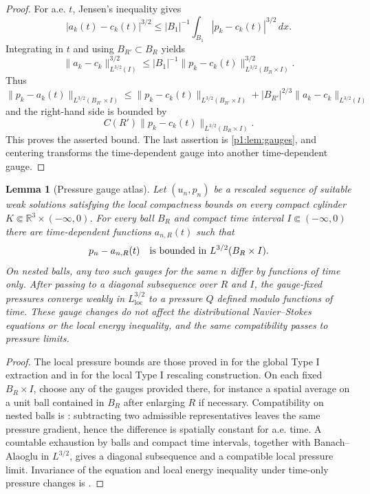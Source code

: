 \documentclass[11pt]{amsart}
\theoremstyle{plain}
\newtheorem{lemma}[lemma]{Lemma}
\theoremstyle{definition}
\theoremstyle{remark}
\numberwithin{equation}{section}
\newcommand{\R}{\mathbb R}
\newcommand{\loc}{\mathrm{loc}}
\begin{document}
\begin{proof}
For a.e. \(t\), Jensen's inequality gives
\[
   |a_k(t)-c_k(t)|^{3/2}
   \le |B_1|^{-1}\int_{B_1}|p_k-c_k(t)|^{3/2}\,dx .
\]
Integrating in \(t\) and using \(B_{R'}\subset B_R\) yields
\[
   \|a_k-c_k\|_{L^{3/2}(I)}^{3/2}
   \le
   |B_1|^{-1}\|p_k-c_k(t)\|_{L^{3/2}(B_R\times I)}^{3/2}.
\]
Thus
\[
   \|p_k-a_k(t)\|_{L^{3/2}(B_{R'}\times I)}
   \le
   \|p_k-c_k(t)\|_{L^{3/2}(B_{R'}\times I)}
   +|B_{R'}|^{2/3}\|a_k-c_k\|_{L^{3/2}(I)}
\]
and the right-hand side is bounded by
\[
   C(R')\|p_k-c_k(t)\|_{L^{3/2}(B_R\times I)} .
\]
This proves the asserted bound.
The last assertion is \cref{p1:lem:gauges}, and centering transforms the
time-dependent gauge into another time-dependent gauge.
\end{proof}

\begin{lemma}[Pressure gauge atlas]\label{p1:lem:pressure-atlas}
Let \((u_n,p_n)\) be a rescaled sequence of suitable weak solutions satisfying
the local compactness bounds on every compact cylinder
\(K\Subset\R^3\times(-\infty,0)\).  For every ball \(B_R\) and compact time
interval \(I\Subset(-\infty,0)\) there are time-dependent functions
\(a_{n,R}(t)\) such that
\[
   p_n-a_{n,R}(t)
   \quad\hbox{is bounded in }L^{3/2}(B_R\times I).
\]
On nested balls, any two such gauges for the same \(n\) differ by functions of
time only.  After passing to a diagonal subsequence over \(R\) and \(I\), the
gauge-fixed pressures converge weakly in \(L^{3/2}_{\loc}\) to a pressure
\(Q\) defined modulo functions of time.  These gauge changes do not affect the
distributional Navier--Stokes equations or the local energy inequality, and
the same compatibility passes to pressure limits.
\end{lemma}

\begin{proof}
The local pressure bounds are those proved in  for the
global Type I extraction and in
 for the local Type I
rescaling construction.  On each fixed \(B_R\times I\), choose any of the gauges
provided there, for instance a spatial average on a unit ball contained in
\(B_R\) after enlarging \(R\) if necessary.  Compatibility on nested balls is
: subtracting two admissible representatives
leaves the same pressure gradient, hence the difference is spatially constant
for a.e. time.  A countable exhaustion by balls and compact time intervals,
together with Banach--Alaoglu in \(L^{3/2}\), gives a diagonal subsequence and
a compatible local pressure limit.  Invariance of the equation and local
energy inequality under time-only pressure changes is .
\end{proof}
\end{document}
